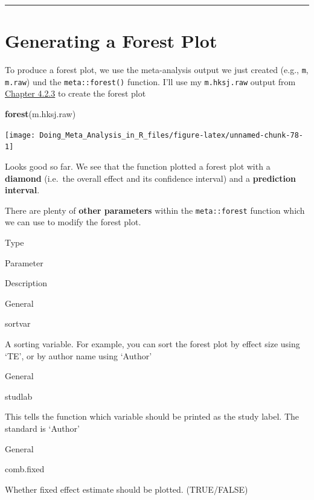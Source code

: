 \documentclass[]{book}
\newenvironment{Shaded}{\begin{snugshade}}{\end{snugshade}}
\newcommand{\KeywordTok}[1]{\textcolor[rgb]{0.13,0.29,0.53}{\textbf{#1}}}
\newcommand{\NormalTok}[1]{#1}
\begin{document}
\begin{center}\rule{0.5\linewidth}{\linethickness}\end{center}

\hypertarget{generating-a-forest-plot}{%
\section{Generating a Forest Plot}\label{generating-a-forest-plot}}

To produce a forest plot, we use the meta-analysis output we just created (e.g., \texttt{m}, \texttt{m.raw}) und the \texttt{meta::forest()} function. I'll use my \texttt{m.hksj.raw} output from \protect\hyperlink{random.raw}{Chapter 4.2.3} to create the forest plot

\begin{Shaded}
\begin{Highlighting}[]
\KeywordTok{forest}\NormalTok{(m.hksj.raw)}
\end{Highlighting}
\end{Shaded}

\begin{center}\texttt{[image: Doing\_Meta\_Analysis\_in\_R\_files/figure-latex/unnamed-chunk-78-1]} \end{center}

Looks good so far. We see that the function plotted a forest plot with a \textbf{diamond} (i.e.~the overall effect and its confidence interval) and a \textbf{prediction interval}.

There are plenty of \textbf{other parameters} within the \texttt{meta::forest} function which we can use to modify the forest plot.

Type

Parameter

Description

General

sortvar

A sorting variable. For example, you can sort the forest plot by effect size using `TE', or by author name using `Author'

General

studlab

This tells the function which variable should be printed as the study label. The standard is `Author'

General

comb.fixed

Whether fixed effect estimate should be plotted. (TRUE/FALSE)
\end{document}
